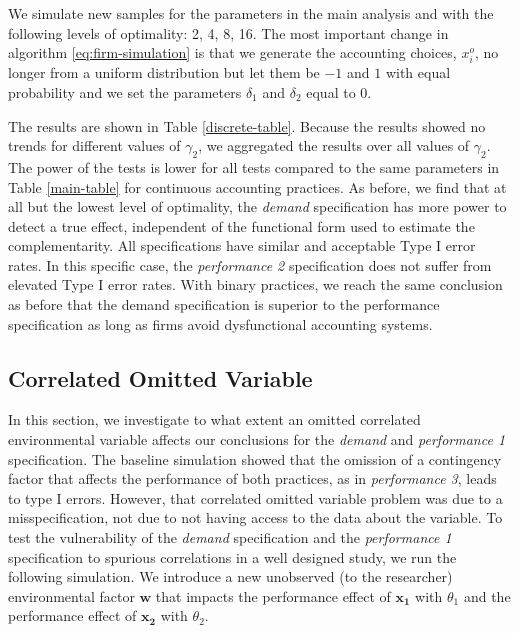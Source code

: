 \documentclass[12pt]{article}
\begin{document}
We simulate new samples for the parameters in the main analysis and with the following levels of optimality: 2, 4, 8, 16. The most important change in algorithm \eqref{eq:firm-simulation} is that we generate the accounting choices, $x_i^o$, no longer from a uniform distribution but let them be $-1$ and $1$ with equal probability and we set the parameters $\delta_1$ and $\delta_2$ equal to $0$.

The results are shown in Table \ref{discrete-table}. Because the results showed no trends for different values of $\gamma_2$, we aggregated the results over all values of $\gamma_2$. The power of the tests is lower for all tests compared to the same parameters in Table \ref{main-table} for continuous accounting practices. As before, we find that at all but the lowest level of optimality, the \emph{demand} specification has more power to detect a true effect, independent of the functional form used to estimate the complementarity. All specifications have similar and acceptable Type I error rates. In this specific case, the \emph{performance 2} specification does not suffer from elevated Type I error rates.  With binary practices, we reach the same conclusion as before that the demand specification is superior to the performance specification as long as firms avoid dysfunctional accounting systems. 



\subsection{Correlated Omitted Variable}

In this section, we investigate to what extent an omitted correlated environmental variable affects our conclusions for the \emph{demand} and \emph{performance 1} specification. The baseline simulation showed that the omission of a contingency factor that affects the performance of both practices, as in \emph{performance 3}, leads to type I errors. However, that correlated omitted variable problem was due to a misspecification, not due to not having access to the data about the variable. To test the vulnerability of the \emph{demand} specification and the \emph{performance 1} specification to spurious correlations in a well designed study, we run the following simulation. We introduce a new unobserved (to the researcher) environmental factor \(\mathbf{w}\) that impacts the performance effect of \(\mathbf{x_1}\) with \(\theta_1\) and the performance effect of \(\mathbf{x_2}\) with \(\theta_2\). 
\end{document}
